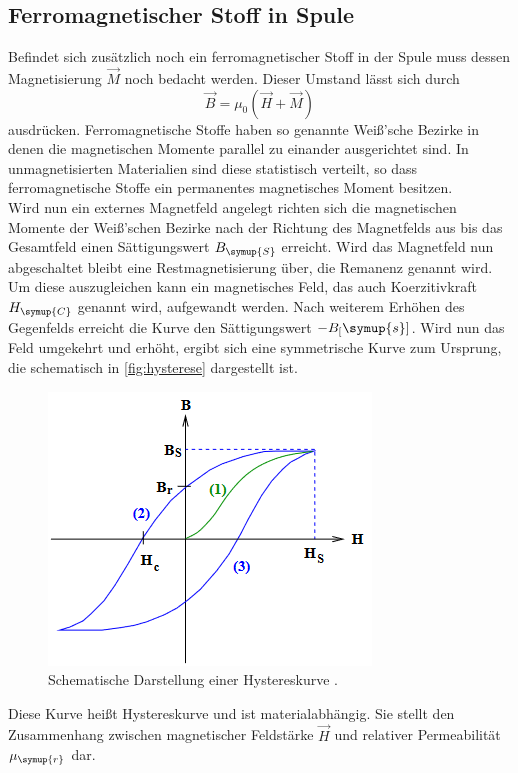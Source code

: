 \subsection{Ferromagnetischer Stoff in Spule}
\label{sec:ferromag}
Befindet sich zusätzlich noch ein ferromagnetischer Stoff in der Spule muss dessen Magnetisierung $\vec{M}$
noch bedacht werden. Dieser Umstand lässt sich durch
\begin{equation}
    \vec{B} = \mu_0 (\vec{H} + \vec{M})
\end{equation}
ausdrücken. Ferromagnetische Stoffe haben so genannte Weiß'sche Bezirke in denen die magnetischen
Momente parallel zu einander ausgerichtet sind. In unmagnetisierten Materialien sind diese statistisch verteilt,
so dass ferromagnetische Stoffe ein permanentes magnetisches Moment besitzen.\\
Wird nun ein externes Magnetfeld angelegt richten sich die magnetischen Momente der Weiß'schen Bezirke
nach der Richtung des Magnetfelds aus bis das Gesamtfeld einen Sättigungswert
$B_{\symup{S}}$ erreicht. Wird das Magnetfeld nun abgeschaltet bleibt eine Restmagnetisierung
über, die Remanenz genannt wird. Um diese auszugleichen kann ein magnetisches Feld, das
auch Koerzitivkraft $H_{\symup{C}}$ genannt wird, aufgewandt werden. Nach weiterem Erhöhen des Gegenfelds
erreicht die Kurve den Sättigungswert $-B_[\symup{s}]$. Wird nun das Feld umgekehrt und erhöht, ergibt sich eine
symmetrische Kurve zum Ursprung, die schematisch in \autoref{fig:hysterese} dargestellt ist.
\begin{figure}[h]
    \centering
    \includegraphics[scale=0.5]{hysterese.png}
    \caption{Schematische Darstellung einer Hystereskurve \cite{sample}.}
    \label{fig:hysterese}
\end{figure}
Diese Kurve heißt Hystereskurve und ist materialabhängig. Sie stellt den Zusammenhang zwischen magnetischer Feldstärke
$\vec{H}$ und relativer Permeabilität $\mu_{\symup{r}}$ dar.